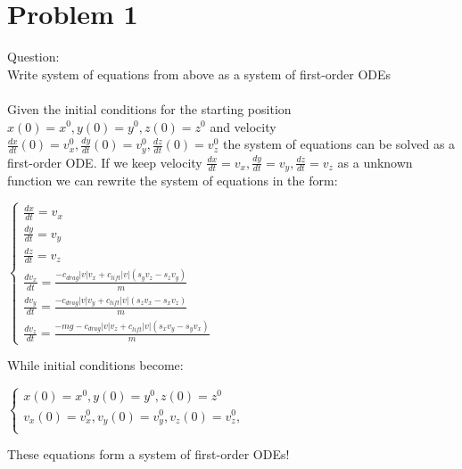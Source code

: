 \documentclass[12pt]{article}
\begin{document}
\newpage
\section{Problem 1}\label{sec::Problem 1}
Question:\\
Write system of equations from above as a system of first-order ODEs\\
\\
Given the initial conditions for the starting position $x(0) = x^0, y(0) = y^0, z(0) = z^0$ and velocity $\frac{dx}{dt}(0) =v_x^0,\frac{dy}{dt}(0) = v_y^0,\frac{dz}{dt}(0) = v_z^0$ the system of equations can be solved as a first-order ODE.  If we keep velocity $\frac{dx}{dt} =v_x,\frac{dy}{dt} = v_y,\frac{dz}{dt} = v_z$ as a unknown function we can rewrite the system of equations in the form:
\begin{center}
$\begin{cases}
\frac{dx}{dt} = v_x \\ 
\frac{dy}{dt} = v_y \\ 
\frac{dz}{dt} = v_z \\ 
\frac{dv_x}{dt} =\frac{ -c_{drag}|v|v_x+c_{lift}|v|(s_yv_z-s_zv_y)}{m}  \\
\frac{dv_y}{dt} =\frac{-c_{drag}|v|v_y+c_{lift}|v|(s_zv_x-s_xv_z)}{m}\\ 
\frac{dv_z}{dt} = \frac{-mg-c_{drag}|v|v_z+c_{lift}|v|(s_xv_y-s_yv_x)}{m}
 \end{cases}$
\end{center}
While initial conditions become:
\begin{center}
$\begin{cases}
x(0) = x^0, y(0) = y^0, z(0) = z^0 \\
v_x(0) =v_x^0,v_y(0) = v_y^0,v_z(0) = v_z^0,\\
 \end{cases}$
\end{center}
These equations form a system of first-order ODEs!

\newpage
\end{document}
